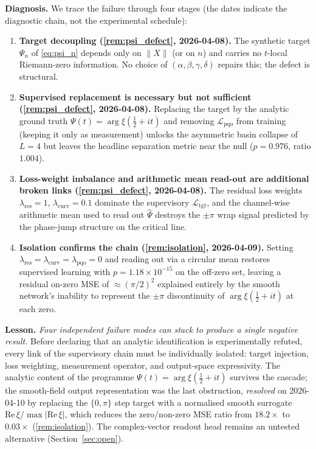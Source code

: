 \documentclass[11pt, a4paper]{article}
\theoremstyle{definition}
\theoremstyle{plain}
\newcommand{\xif}{\xi}                      %
\newcommand{\Psip}{\Psi}                    %
\newcommand{\Lpqo}{\mathcal{L}_{\mathrm{pqo}}}
\begin{document}
\textbf{Diagnosis.} We trace the failure through four stages (the
dates indicate the diagnostic chain, not the experimental schedule):
\begin{enumerate}
  \item \textbf{Target decoupling (\cref{rem:psi_defect},
        2026-04-08).} The synthetic target $\Psi_n$ of
        \cref{eq:psi_n} depends only on $\|X\|$ (or on $n$) and
        carries no $t$-local Riemann-zero information. No choice of
        $(\alpha,\beta,\gamma,\delta)$ repairs this; the defect is
        structural.
  \item \textbf{Supervised replacement is necessary but not
        sufficient (\cref{rem:psi_defect}, 2026-04-08).} Replacing
        the target by the analytic ground truth
        $\Psip(t)=\arg\xif(\tfrac{1}{2}+it)$ and removing
        $\Lpqo$ from training (keeping it only as measurement)
        unlocks the asymmetric basin collapse of $L=4$ but leaves the
        headline separation metric near the null
        ($p=0.976$, ratio $1.004$).
  \item \textbf{Loss-weight imbalance and arithmetic mean read-out
        are additional broken links (\cref{rem:psi_defect},
        2026-04-08).} The residual loss weights
        $\lambda_{\mathrm{res}}=1$, $\lambda_{\mathrm{curv}}=0.1$
        dominate the supervisory $\mathcal{L}_{\mathrm{tgt}}$, and the
        channel-wise arithmetic mean used to read out $\hat\Psip$
        destroys the $\pm\pi$ wrap signal predicted by the
        phase-jump structure on the critical line.
  \item \textbf{Isolation confirms the chain
        (\cref{rem:isolation}, 2026-04-09).} Setting
        $\lambda_{\mathrm{res}}=\lambda_{\mathrm{curv}}=\lambda_{\mathrm{pqo}}=0$
        and reading out via a circular mean restores supervised
        learning with $p=1.18\times10^{-15}$ on the off-zero set,
        leaving a residual on-zero MSE of $\approx(\pi/2)^2$
        explained entirely by the smooth network's inability to
        represent the $\pm\pi$ discontinuity of
        $\arg\xif(\tfrac{1}{2}+it)$ at each zero.
\end{enumerate}

\textbf{Lesson.} \emph{Four independent failure modes can stack to
produce a single negative result.} Before declaring that an analytic
identification is experimentally refuted, every link of the
supervisory chain must be individually isolated: target injection,
loss weighting, measurement operator, and output-space expressivity.
The analytic content of the programme
$\Psip(t)=\arg\xif(\tfrac{1}{2}+it)$ survives the cascade; the
smooth-field output representation was the last obstruction,
\emph{resolved} on 2026-04-10 by replacing the $\{0,\pi\}$ step
target with a normalised smooth surrogate
$\mathrm{Re}\,\xif/\max|\mathrm{Re}\,\xif|$, which reduces the
zero/non-zero MSE ratio from $18.2\times$ to $0.03\times$
(\cref{rem:isolation}). The complex-vector readout head remains
an untested alternative (Section~\ref{sec:open}).
\end{document}

